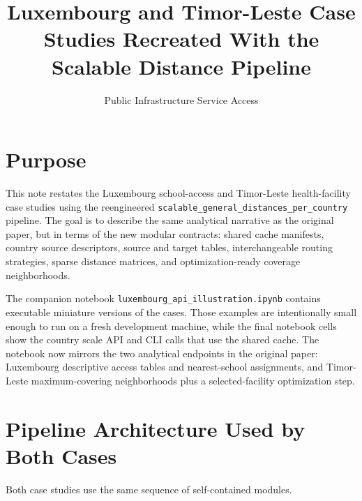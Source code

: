 \documentclass[11pt]{article}
\title{Luxembourg and Timor-Leste Case Studies Recreated With the Scalable Distance Pipeline}
\author{Public Infrastructure Service Access}
\date{}
\begin{document}
\maketitle

\section{Purpose}

This note restates the Luxembourg school-access and Timor-Leste health-facility
case studies using the reengineered
\texttt{scalable\_general\_distances\_per\_country} pipeline.  The goal is to
describe the same analytical narrative as the original paper, but in terms of
the new modular contracts: shared cache manifests, country source descriptors,
source and target tables, interchangeable routing strategies, sparse distance
matrices, and optimization-ready coverage neighborhoods.

The companion notebook
\texttt{luxembourg\_api\_illustration.ipynb} contains executable miniature
versions of the cases.  Those examples are intentionally small enough to run on
a fresh development machine, while the final notebook cells show the country
scale API and CLI calls that use the shared cache.  The notebook now mirrors
the two analytical endpoints in the original paper: Luxembourg descriptive
access tables and nearest-school assignments, and Timor-Leste maximum-covering
neighborhoods plus a selected-facility optimization step.

\section{Pipeline Architecture Used by Both Cases}

Both case studies use the same sequence of self-contained modules.
\end{document}

